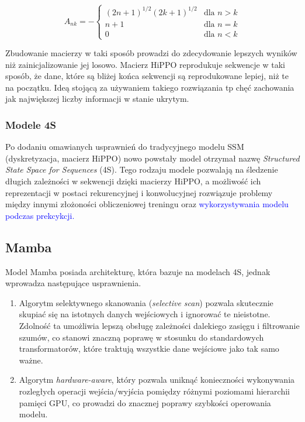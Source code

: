 \documentclass[data-science]{agh-wi} %
\begin{document}
\begin{equation}
    A_{nk} = -
    \begin{cases}
        (2n + 1)^{1/2} (2k + 1)^{1/2} & \text{dla } n > k \\
        n + 1                         & \text{dla } n = k \\
        0                             & \text{dla } n < k
    \end{cases}
    \label{equ:hippo_matrix}
\end{equation}

Zbudowanie macierzy w taki sposób prowadzi do zdecydowanie lepszych wyników niż zainicjalizowanie jej losowo. Macierz HiPPO reprodukuje sekwencje w taki sposób, że dane, które są bliżej końca sekwencji są reprodukowane lepiej, niż te na początku. Ideą stojącą za używaniem takiego rozwiązania tp chęć zachowania jak największej liczby informacji w stanie ukrytym.

\subsubsection*{Modele 4S}
Po dodaniu omawianych usprawnień do tradycyjnego modelu SSM (dyskretyzacja, macierz HiPPO) nowo powstały model otrzymał nazwę \textit{Structured State Space for Sequences} (4S). Tego rodzaju modele pozwalają na śledzenie długich zależności w sekwencji dzięki macierzy HiPPO, a możliwość ich reprezentacji w postaci rekurencyjnej i konwolucyjnej rozwiązuje problemy między innymi złożoności obliczeniowej treningu oraz \textcolor{blue}{wykorzystywania modelu podczas prekcykcji.}

\subsection{Mamba}
Model Mamba posiada architekturę, która bazuje na modelach 4S, jednak wprowadza następujące usprawnienia.
\begin{enumerate}
    \item Algorytm selektywnego skanowania (\textit{selective scan}) pozwala skutecznie skupiać się na istotnych danych wejściowych i ignorować te nieistotne. Zdolność ta umożliwia lepszą obsługę zależności dalekiego zasięgu i filtrowanie szumów, co stanowi znaczną poprawę w stosunku do standardowych transformatorów, które traktują wszystkie dane wejściowe jako tak samo ważne.
    \item Algorytm \textit{hardware-aware}, który pozwala uniknąć konieczności wykonywania rozległych operacji wejścia/wyjścia pomiędzy różnymi poziomami hierarchii pamięci GPU, co prowadzi do znacznej poprawy szybkości operowania modelu.
\end{enumerate}
\end{document}

